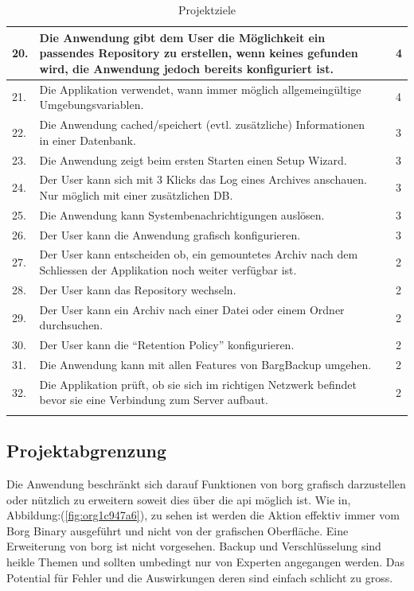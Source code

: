 \begin{longtable}{|p{1cm}|p{9cm}|p{1.5cm}|p{2cm}|}
\hline
20. & Die Anwendung gibt dem User die Möglichkeit ein passendes Repository zu erstellen, wenn keines gefunden wird, die Anwendung jedoch bereits konfiguriert ist. &  & 4\\
\hline
21. & Die Applikation verwendet, wann immer möglich allgemeingültige Umgebungsvariablen. &  & 4\\
\hline
22. & Die Anwendung cached/speichert (evtl. zusätzliche) Informationen in einer Datenbank. &  & 3\\
\hline
23. & Die Anwendung zeigt beim ersten Starten einen Setup Wizard. &  & 3\\
\hline
24. & Der User kann sich mit 3 Klicks das Log eines Archives anschauen. Nur möglich mit einer zusätzlichen DB. &  & 3\\
\hline
25. & Die Anwendung kann Systembenachrichtigungen auslösen. &  & 3\\
\hline
26. & Der User kann die Anwendung grafisch konfigurieren. &  & 3\\
\hline
27. & Der User kann entscheiden ob, ein gemountetes Archiv nach dem Schliessen der Applikation noch weiter verfügbar ist. &  & 2\\
\hline
28. & Der User kann das Repository wechseln. &  & 2\\
\hline
29. & Der User kann ein Archiv nach einer Datei oder einem Ordner durchsuchen. &  & 2\\
\hline
30. & Der User kann die "`Retention Policy"' konfigurieren. &  & 2\\
\hline
31. & Die Anwendung kann mit allen Features von BargBackup umgehen. &  & 2\\
\hline
32. & Die Applikation prüft, ob sie sich im richtigen Netzwerk befindet bevor sie eine Verbindung zum Server aufbaut. &  & 2\\
\hline
\caption{\label{tab:org0d40904}
Projektziele}
\\
\end{longtable}
\newpage

\subsection{Projektabgrenzung}
\label{sec:orgf37414a}

Die Anwendung beschränkt sich darauf Funktionen von \gls{borg} grafisch
darzustellen oder nützlich zu erweitern soweit dies über die \gls{api} möglich
ist. Wie in, Abbildung:(\ref{fig:org1c947a6}), zu sehen ist werden die Aktion effektiv
immer vom Borg Binary ausgeführt und nicht von der grafischen Oberfläche. Eine
Erweiterung von \gls{borg} ist nicht vorgesehen. Backup und Verschlüsselung sind
heikle Themen und sollten umbedingt nur von Experten angegangen werden. Das
Potential für Fehler und die Auswirkungen deren sind einfach schlicht zu gross.

